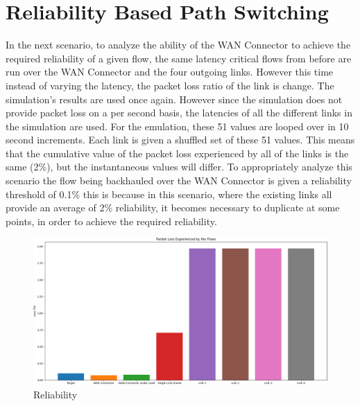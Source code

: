 \section{Reliability Based Path Switching}

In the next scenario, to analyze the ability of the WAN Connector to achieve the required reliability of a given flow, the same latency critical flows from before are run over the WAN Connector and the four outgoing links. However this time instead of varying the latency, the packet loss ratio of the link is change. The simulation's results are used once again. However since the simulation does not provide packet loss on a per second basis, the latencies of all the different links in the simulation are used. For the emulation, these 51 values are looped over in 10 second increments. Each link is given a shuffled set of these 51 values. This means that the cumulative value of the packet loss experienced by all of the links is the same (2\%), but the instantaneous values will differ. To appropriately analyze this scenario the flow being backhauled over the WAN Connector is given a reliability threshold of 0.1\% this is because in this scenario, where the existing links all provide an average of 2\% reliability, it becomes necessary to duplicate at some points, in order to achieve the required reliability. 

\begin{figure}[h]
    \centering
        \includegraphics[height=0.66\textwidth,width=\textwidth]{fig/loss_bars1.png}
        \caption{Reliability}
        \label{fig:loss_bars1}
\end{figure}

